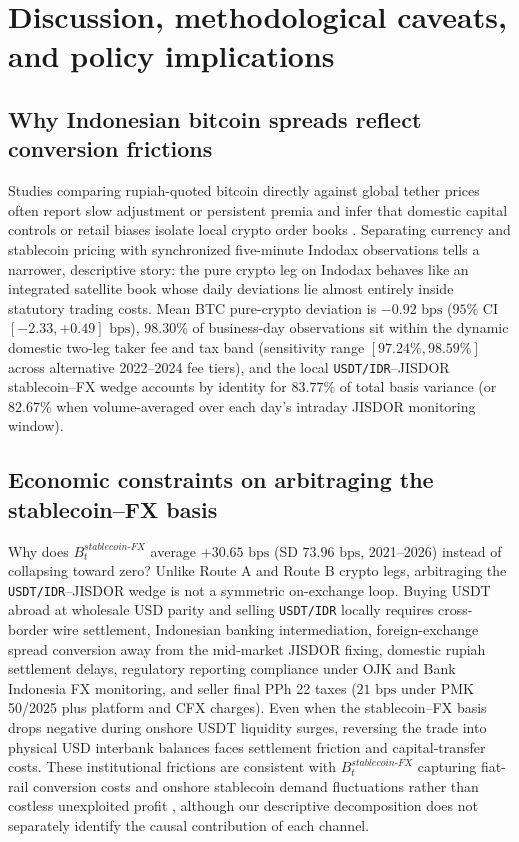 \section{Discussion, methodological caveats, and policy implications}
\label{sec:discussion}

\subsection{Why Indonesian bitcoin spreads reflect conversion frictions}
Studies comparing rupiah-quoted bitcoin directly against global tether prices often report slow adjustment or persistent premia and infer that domestic capital controls or retail biases isolate local crypto order books \citep{maulana2026segmentasi,makarov2020trading}. Separating currency and stablecoin pricing with synchronized five-minute Indodax observations tells a narrower, descriptive story: the pure crypto leg on Indodax behaves like an integrated satellite book whose daily deviations lie almost entirely inside statutory trading costs. Mean BTC pure-crypto deviation is $-0.92\text{ bps}$ ($95\%$ CI $[-2.33, +0.49]\text{ bps}$), $98.30\%$ of business-day observations sit within the dynamic domestic two-leg taker fee and tax band (sensitivity range $[97.24\%, 98.59\%]$ across alternative 2022--2024 fee tiers), and the local \texttt{USDT/IDR}--JISDOR stablecoin--FX wedge accounts by identity for $83.77\%$ of total basis variance (or $82.67\%$ when volume-averaged over each day's intraday JISDOR monitoring window).

\subsection{Economic constraints on arbitraging the stablecoin--FX basis}
Why does $B_t^{stablecoin\text{-}FX}$ average $+30.65\text{ bps}$ (SD $73.96\text{ bps}$, 2021--2026) instead of collapsing toward zero? Unlike Route A and Route B crypto legs, arbitraging the \texttt{USDT/IDR}--JISDOR wedge is not a symmetric on-exchange loop. Buying USDT abroad at wholesale USD parity and selling \texttt{USDT/IDR} locally requires cross-border wire settlement, Indonesian banking intermediation, foreign-exchange spread conversion away from the mid-market JISDOR fixing, domestic rupiah settlement delays, regulatory reporting compliance under OJK and Bank Indonesia FX monitoring, and seller final PPh 22 taxes ($21\text{ bps}$ under PMK 50/2025 plus platform and CFX charges). Even when the stablecoin--FX basis drops negative during onshore USDT liquidity surges, reversing the trade into physical USD interbank balances faces settlement friction and capital-transfer costs. These institutional frictions are consistent with $B_t^{stablecoin\text{-}FX}$ capturing fiat-rail conversion costs and onshore stablecoin demand fluctuations rather than costless unexploited profit \citep{lyons2023stablecoins,lee2022kimchi}, although our descriptive decomposition does not separately identify the causal contribution of each channel.

